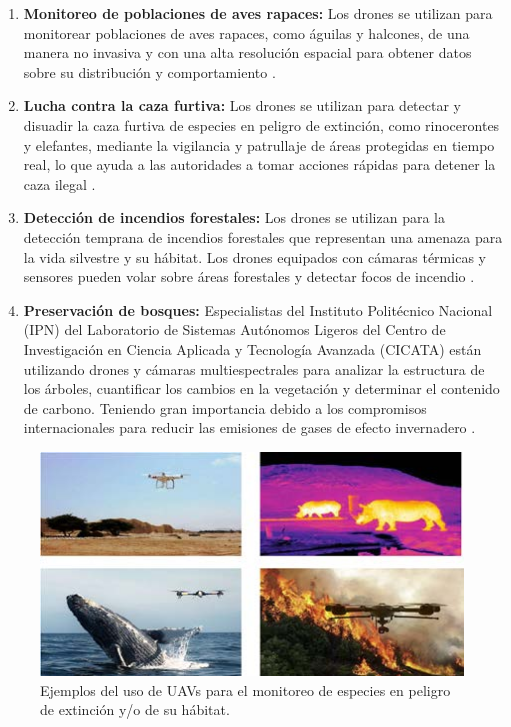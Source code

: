 \begin{enumerate}
\item \textbf{Monitoreo de poblaciones de aves rapaces:} Los drones se utilizan para monitorear poblaciones de aves rapaces, como águilas y halcones, de una manera no invasiva y con una alta resolución espacial para obtener datos sobre su distribución y comportamiento \cite{40}.
\item \textbf{Lucha contra la caza furtiva:} Los drones se utilizan para detectar y disuadir la caza furtiva de especies en peligro de extinción, como rinocerontes y elefantes, mediante la vigilancia y patrullaje de áreas protegidas en tiempo real, lo que ayuda a las autoridades a tomar acciones rápidas para detener la caza ilegal \cite{41}.
\item \textbf{Detección de incendios forestales:} Los drones se utilizan para la detección temprana de incendios forestales que representan una amenaza para la vida silvestre y su hábitat. Los drones equipados con cámaras térmicas y sensores pueden volar sobre áreas forestales y detectar focos de incendio \cite{42}.
\item \textbf{Preservación de bosques:} Especialistas del Instituto Politécnico Nacional (IPN) del Laboratorio de Sistemas Autónomos Ligeros del Centro de Investigación en Ciencia Aplicada y Tecnología Avanzada (CICATA) están utilizando drones y cámaras multiespectrales para analizar la estructura de los árboles, cuantificar los cambios en la vegetación y determinar el contenido de carbono. Teniendo gran importancia debido a los compromisos internacionales para reducir las emisiones de gases de efecto invernadero \cite{42.2}.
\end{enumerate}

\begin{figure}[H]
    \centering
    \includegraphics[width=0.5\linewidth]{imagenes/img8_ejemplos_uavs.jpg}
    \caption{Ejemplos del uso de UAVs para el monitoreo de especies en peligro de extinción y/o de su hábitat.}
    \label{fig:enter-label}
\end{figure}

